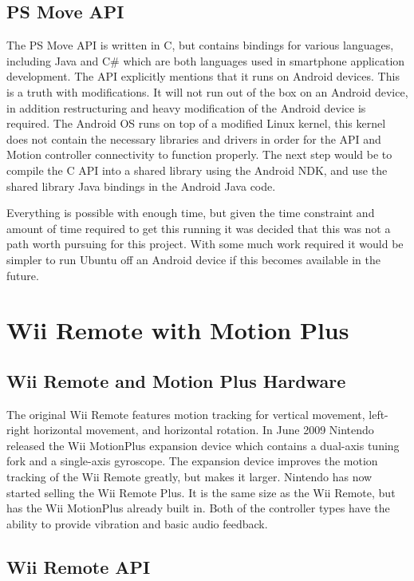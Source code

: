 \documentclass[11pt,twoside,a4paper]{report}
\begin{document}
\subsection{PS Move API}

The PS Move API is written in C, but contains bindings for various languages, including Java and C\# which are both languages used in smartphone application development. The API explicitly mentions that it runs on Android devices. This is a truth with modifications. It will not run out of the box on an Android device, in addition restructuring and heavy modification of the Android device is required.  The Android OS runs on top of a modified Linux kernel, this kernel does not contain the necessary libraries and drivers in order for the API and Motion controller connectivity to function properly. %
The next step would be to compile the C API into a shared library using the Android NDK, and use the shared library Java bindings in the Android Java code.

Everything is possible with enough time, but given the time constraint and amount of time required to get this running it was decided that this was not a path worth pursuing for this project. With some much work required it would be simpler to run Ubuntu off an Android device if this becomes available in the future. %

\section{Wii Remote with Motion Plus}

\subsection{Wii Remote and Motion Plus Hardware}
The original Wii Remote features motion tracking for vertical movement, left-right horizontal movement, and horizontal rotation. %
In June 2009 %
Nintendo released the Wii MotionPlus expansion device which contains a dual-axis tuning fork and a single-axis gyroscope. %
The expansion device improves the motion tracking of the Wii Remote greatly, but makes it larger. Nintendo has now started selling the Wii Remote Plus. It is the same size as the Wii Remote, but has the Wii MotionPlus already built in. Both of the controller types have the ability to provide vibration and basic audio feedback.

\subsection{Wii Remote API}
\end{document}
